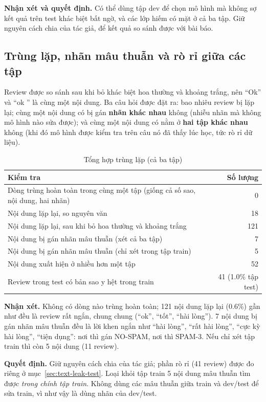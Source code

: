 \textbf{Nhận xét và quyết định.} Có thể dùng tập dev để chọn mô hình mà không sợ kết quả trên test khác biệt bất ngờ, và các lớp
hiếm có mặt ở cả ba tập. Giữ nguyên cách chia của tác giả, để kết quả so sánh được với bài báo.

\subsection{Trùng lặp, nhãn mâu thuẫn và rò rỉ giữa các tập}
\label{sec:text-dup}
Review được so sánh sau khi bỏ khác biệt hoa thường và khoảng trắng, nên ``Ok'' và ``ok '' là cùng một nội dung.
Ba câu hỏi được đặt ra: bao nhiêu review bị lặp lại; cùng một nội dung có bị gán \textbf{nhãn khác nhau} không (nhiễu nhãn mà không mô hình nào sửa được);
và cùng một nội dung có nằm ở \textbf{hai tập khác nhau} không (khi đó mô hình được kiểm tra trên câu nó đã thấy lúc học, tức rò rỉ dữ liệu).

\begin{table}[H]
\centering
\caption{Tổng hợp trùng lặp (cả ba tập)}
\label{tab:text-dup}
\begin{tabular}{>{\raggedright\arraybackslash}p{11.4cm}r}
\toprule
Kiểm tra & Số lượng\\
\midrule
Dòng trùng hoàn toàn trong cùng một tập (giống cả số sao, nội dung, hai nhãn) & 0\\
Nội dung lặp lại, so nguyên văn & 18\\
Nội dung lặp lại, sau khi bỏ hoa thường và khoảng trắng & 121\\
Nội dung bị gán nhãn mâu thuẫn (xét cả ba tập) & 7\\
Nội dung bị gán nhãn mâu thuẫn (chỉ xét trong tập train) & 5\\
Nội dung xuất hiện ở nhiều hơn một tập & 52\\
Review trong test có bản sao y hệt trong train & 41 (1.0\% tập test)\\
\bottomrule
\end{tabular}
\end{table}

\textbf{Nhận xét.} Không có dòng nào trùng hoàn toàn; 121 nội dung lặp lại (0.6\%) gần như đều là review rất ngắn, chung chung
(``ok'', ``tốt'', ``hài lòng''). 7 nội dung bị gán nhãn mâu thuẫn đều là lời khen ngắn như ``hài lòng'', ``rất hài lòng'', ``cực kỳ hài lòng'',
``tiện dụng'': nơi thì gán NO-SPAM, nơi thì SPAM-3. Nếu chỉ xét tập train thì còn 5 nội dung (11 review).

\textbf{Quyết định.} Giữ nguyên cách chia của tác giả; phần rò rỉ (41 review) được đo riêng ở mục~\ref{sec:text-leak-test}.
Loại khỏi tập train 5 nội dung mâu thuẫn tìm được \emph{trong chính tập train}. Không dùng các mâu thuẫn giữa train và dev/test
để sửa train, vì như vậy là dùng nhãn của dev/test.

